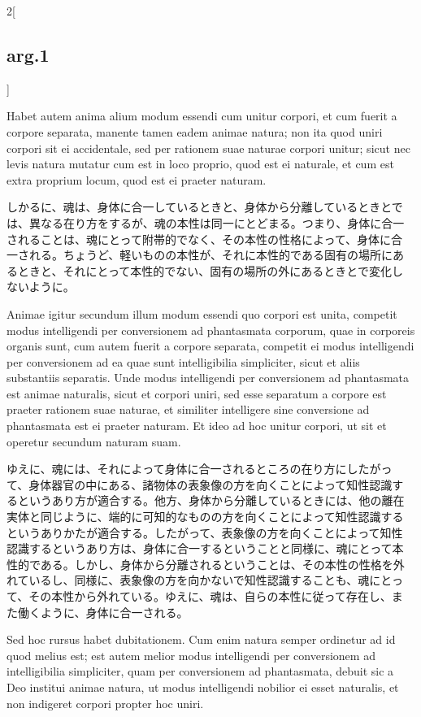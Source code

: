 \documentclass[paper=a4paper,fontsize=10pt,jafontsize=9pt,titlepage]{jlreq}
\begin{document}
\begin{paracol}{2}[\subsection{arg.1}]
\switchcolumn*

Habet autem anima alium modum essendi cum unitur corpori, et cum
fuerit a corpore separata, manente tamen eadem animae natura; non ita
quod uniri corpori sit ei accidentale, sed per rationem suae naturae
corpori unitur; sicut nec levis natura mutatur cum est in loco
proprio, quod est ei naturale, et cum est extra proprium locum, quod
est ei praeter naturam.

\switchcolumn

しかるに、魂は、身体に合一しているときと、身体から分離しているときとで
は、異なる在り方をするが、魂の本性は同一にとどまる。つまり、身体に合一
されることは、魂にとって附帯的でなく、その本性の性格によって、身体に合
一される。ちょうど、軽いものの本性が、それに本性的である固有の場所にあ
るときと、それにとって本性的でない、固有の場所の外にあるときとで変化し
ないように。

\switchcolumn*

Animae igitur secundum illum modum essendi quo corpori est unita,
competit modus intelligendi per conversionem ad phantasmata corporum,
quae in corporeis organis sunt, cum autem fuerit a corpore separata,
competit ei modus intelligendi per conversionem ad ea quae sunt
intelligibilia simpliciter, sicut et aliis substantiis separatis. Unde
modus intelligendi per conversionem ad phantasmata est animae
naturalis, sicut et corpori uniri, sed esse separatum a corpore est
praeter rationem suae naturae, et similiter intelligere sine
conversione ad phantasmata est ei praeter naturam. Et ideo ad hoc
unitur corpori, ut sit et operetur secundum naturam suam.

\switchcolumn

ゆえに、魂には、それによって身体に合一されるところの在り方にしたがっ
て、身体器官の中にある、諸物体の表象像の方を向くことによって知性認識す
るというあり方が適合する。他方、身体から分離しているときには、他の離在
実体と同じように、端的に可知的なものの方を向くことによって知性認識する
というありかたが適合する。したがって、表象像の方を向くことによって知性
認識するというあり方は、身体に合一するということと同様に、魂にとって本
性的である。しかし、身体から分離されるということは、その本性の性格を外
れているし、同様に、表象像の方を向かないで知性認識することも、魂にとっ
て、その本性から外れている。ゆえに、魂は、自らの本性に従って存在し、ま
た働くように、身体に合一される。

\switchcolumn*

Sed hoc rursus habet dubitationem. Cum enim natura semper ordinetur ad
id quod melius est; est autem melior modus intelligendi per
conversionem ad intelligibilia simpliciter, quam per conversionem ad
phantasmata, debuit sic a Deo institui animae natura, ut modus
intelligendi nobilior ei esset naturalis, et non indigeret corpori
propter hoc uniri.


\end{paracol}
\end{document}
